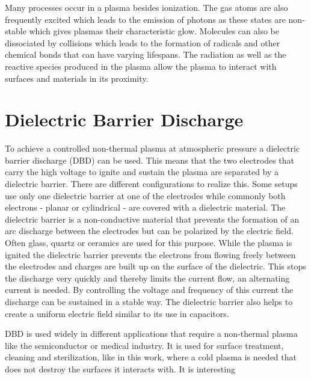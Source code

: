 Many processes occur in a plasma besides ionization. The gas atoms are also frequently excited which leads to the emission of photons as these states are non-stable which gives plasmas their characteristic glow. Molecules can also be dissociated by collisions which leads to the formation of radicals and other chemical bonds that can have varying lifespans. The radiation as well as the reactive species produced in the plasma allow the plasma to interact with surfaces and materials in its proximity.

\section{Dielectric Barrier Discharge}
To achieve a controlled non-thermal plasma at atmospheric pressure a dielectric barrier discharge (DBD) can be used. This means that the two electrodes that carry the high voltage to ignite and sustain the plasma are separated by a dielectric barrier. There are different configurations to realize this. Some setups use only one dielectric barrier at one of the electrodes while commonly both electrons - planar or cylindrical - are covered with a dielectric material. The dielectric barrier is a non-conductive material that prevents the formation of an arc discharge between the electrodes but can be polarized by the electric field. Often glass, quartz or ceramics are used for this purpose. While the plasma is ignited the dielectric barrier prevents the electrons from flowing freely between the electrodes and charges are built up on the surface of the dielectric. This stops the discharge very quickly and thereby limits the current flow, an alternating current is needed. By controlling the voltage and frequency of this current the discharge can be sustained in a stable way. The dielectric barrier also helps to create a uniform electric field similar to its use in capacitors. 

DBD is used widely in different applications that require a non-thermal plasma like the semiconductor or medical industry. It is used for surface treatment, cleaning and sterilization, like in this work, where a cold plasma is needed that does not destroy the surfaces it interacts with. It is interesting

